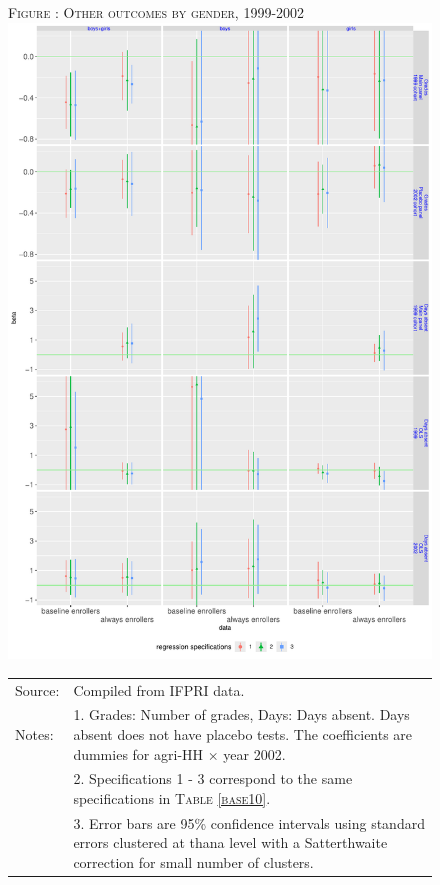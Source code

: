\documentclass[12pt,letterpaper]{article}
\newcommand{\0}{\ensuremath{\mbox{\boldmath $0$}}}
\begin{document}
{\begin{figure}
\hfil\textsc{\footnotesize Figure \thefigure: Other outcomes by gender, 1999-2002\label{NumGradesDaysAbsentPlots}}\\
\hfil \includegraphics[height=.3\paperheight]{Figures/App_NumGradesDaysAbsentPlotsByGender.pdf}\\
\renewcommand{\arraystretch}{1}
\hfil\begin{tabular}{>{\hfill\scriptsize}p{1cm}<{}>{\scriptsize}p{11cm}<{\hfill}}
Source: & Compiled from IFPRI data. \\[-1ex]
Notes:& 1. Grades: Number of grades, Days: Days absent. Days absent does not have placebo tests. The coefficients are dummies for agri-HH $\times$ year 2002.\\[-1ex]
& 2. Specifications 1 - 3 correspond to the same specifications in \textsc{Table \ref{base10}}. \\[-1ex]
& 3. Error bars are 95\% confidence intervals using standard errors clustered at thana level with a Satterthwaite correction for small number of clusters.
\end{tabular}
\end{figure}



}
\end{document}
